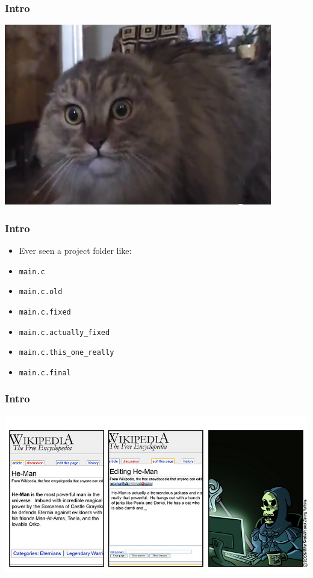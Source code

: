\documentclass[%
        hyperref={%
                pdfauthor={Zakariyya Mughal},%
                pdfpagemode={None},pdfpagelayout={SinglePage}}%
        xcolor={x11names},%
]{beamer}
\begin{document}
\begin{frame}
\frametitle{Intro}
\includegraphics[width=\textwidth]{gfx/nonono.png}
\end{frame}

\begin{frame}
\frametitle{Intro}
\begin{itemize}
\item[] Ever seen a project folder like:
\item[] \qquad \texttt{main.c}
\item[] \qquad \texttt{main.c.old}
\item[] \qquad \texttt{main.c.fixed}
\item[] \qquad \texttt{main.c.actually\_fixed}
\item[] \qquad \texttt{main.c.this\_one\_really}
\item[] \qquad \texttt{main.c.final}
\end{itemize}
\end{frame}

\begin{frame}
\frametitle{Intro}
\includegraphics[width=\textwidth]{gfx/skeletor.jpg}
\end{frame}
\end{document}
